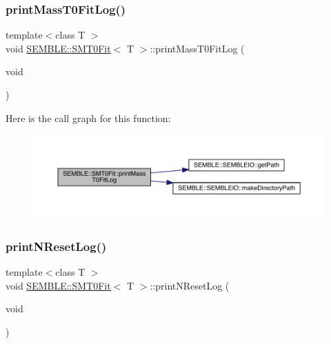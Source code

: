 \mbox{\label{structSEMBLE_1_1SMT0Fit_acfb1bcb9dbae9eb752ca05769ab0caa4}} 
\subsubsection{\texorpdfstring{printMassT0FitLog()}{printMassT0FitLog()}\hspace{0.1cm}{\footnotesize\ttfamily [2/2]}}
{\footnotesize\ttfamily template$<$class T $>$ \\
void \mbox{\hyperlink{structSEMBLE_1_1SMT0Fit}{S\+E\+M\+B\+L\+E\+::\+S\+M\+T0\+Fit}}$<$ T $>$\+::print\+Mass\+T0\+Fit\+Log (\begin{DoxyParamCaption}\item[{void}]{ }\end{DoxyParamCaption})}

Here is the call graph for this function\+:
\nopagebreak
\begin{figure}[H]
\begin{center}
\leavevmode
\includegraphics[width=350pt]{d6/dad/structSEMBLE_1_1SMT0Fit_acfb1bcb9dbae9eb752ca05769ab0caa4_cgraph}
\end{center}
\end{figure}
\mbox{\label{structSEMBLE_1_1SMT0Fit_a45f5b6b87ab4828a73de4150eec496b1}} 
\subsubsection{\texorpdfstring{printNResetLog()}{printNResetLog()}\hspace{0.1cm}{\footnotesize\ttfamily [1/2]}}
{\footnotesize\ttfamily template$<$class T $>$ \\
void \mbox{\hyperlink{structSEMBLE_1_1SMT0Fit}{S\+E\+M\+B\+L\+E\+::\+S\+M\+T0\+Fit}}$<$ T $>$\+::print\+N\+Reset\+Log (\begin{DoxyParamCaption}\item[{void}]{ }\end{DoxyParamCaption})}

